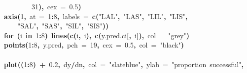 \documentclass{article}
\makeatletter
\newcommand{\hlnumber}[1]{\textcolor[rgb]{0,0,0}{#1}}%
\newcommand{\hlfunctioncall}[1]{\textcolor[rgb]{.5,0,.33}{\textbf{#1}}}%
\newcommand{\hlstring}[1]{\textcolor[rgb]{.6,.6,1}{#1}}%
\newcommand{\hlkeyword}[1]{\textbf{#1}}%
\newcommand{\hlargument}[1]{\textcolor[rgb]{.69,.25,.02}{#1}}%
\newcommand{\hlsymbol}[1]{#1}%
\newcommand{\hlstd}[1]{\textcolor[rgb]{0,0,0}{#1}}%
\newenvironment{kframe}{%
 \def\FrameCommand##1{\hskip\@totalleftmargin \hskip-\fboxsep
 \colorbox{shadecolor}{##1}\hskip-\fboxsep
     \hskip-\linewidth \hskip-\@totalleftmargin \hskip\columnwidth}%
 \MakeFramed {\advance\hsize-\width
   \@totalleftmargin\z@ \linewidth\hsize
   \@setminipage}}%
 {\par\unskip\endMakeFramed}
\newenvironment{knitrout}{}{} %
\makeatother
\begin{document}
\begin{knitrout}
{\begin{kframe}
\begin{flushleft}
\hlstd{}{\ }{\ }{\ }{\ }{\ }{\ }{\ }{\ }\hlnumber{31}\hlkeyword{)}\hlkeyword{,}{\ }\hlargument{cex}{\ }\hlargument{=}{\ }\hlnumber{0.5}\hlkeyword{)}\hspace*{\fill}\\
\hlstd{}\hlfunctioncall{axis}\hlkeyword{(}\hlnumber{1}\hlkeyword{,}{\ }\hlargument{at}{\ }\hlargument{=}{\ }\hlnumber{1}\hlkeyword{:}\hlnumber{8}\hlkeyword{,}{\ }\hlargument{labels}{\ }\hlargument{=}{\ }\hlfunctioncall{c}\hlkeyword{(}\hlstring{"LAL"}\hlkeyword{,}{\ }\hlstring{"LAS"}\hlkeyword{,}{\ }\hlstring{"LIL"}\hlkeyword{,}{\ }\hlstring{"LIS"}\hlkeyword{,}\hspace*{\fill}\\
\hlstd{}{\ }{\ }{\ }{\ }\hlstring{"SAL"}\hlkeyword{,}{\ }\hlstring{"SAS"}\hlkeyword{,}{\ }\hlstring{"SIL"}\hlkeyword{,}{\ }\hlstring{"SIS"}\hlkeyword{)}\hlkeyword{)}\hspace*{\fill}\\
\hlstd{}\hlkeyword{for}{\ }\hlkeyword{(}\hlsymbol{i}{\ }\hlkeyword{in}{\ }\hlnumber{1}\hlkeyword{:}\hlnumber{8}\hlkeyword{)}{\ }\hlfunctioncall{lines}\hlkeyword{(}\hlfunctioncall{c}\hlkeyword{(}\hlsymbol{i}\hlkeyword{,}{\ }\hlsymbol{i}\hlkeyword{)}\hlkeyword{,}{\ }\hlfunctioncall{c}\hlkeyword{(}\hlsymbol{y.pred.ci}\hlkeyword{[}\hlkeyword{,}{\ }\hlsymbol{i}\hlkeyword{]}\hlkeyword{)}\hlkeyword{,}{\ }\hlargument{col}{\ }\hlargument{=}{\ }\hlstring{"grey"}\hlkeyword{)}\hspace*{\fill}\\
\hlstd{}\hlfunctioncall{points}\hlkeyword{(}\hlnumber{1}\hlkeyword{:}\hlnumber{8}\hlkeyword{,}{\ }\hlsymbol{y.pred}\hlkeyword{,}{\ }\hlargument{pch}{\ }\hlargument{=}{\ }\hlnumber{19}\hlkeyword{,}{\ }\hlargument{cex}{\ }\hlargument{=}{\ }\hlnumber{0.5}\hlkeyword{,}{\ }\hlargument{col}{\ }\hlargument{=}{\ }\hlstring{"black"}\hlkeyword{)}\hspace*{\fill}\\
\hlstd{}\hspace*{\fill}\\
\hlstd{}\hlfunctioncall{plot}\hlkeyword{(}\hlkeyword{(}\hlnumber{1}\hlkeyword{:}\hlnumber{8}\hlkeyword{)}{\ }\hlkeyword{+}{\ }\hlnumber{0.2}\hlkeyword{,}{\ }\hlsymbol{d}\hlkeyword{\usebox{\hlnormalsizeboxdollar}}\hlsymbol{y}\hlkeyword{/}\hlsymbol{d}\hlkeyword{\usebox{\hlnormalsizeboxdollar}}\hlsymbol{n}\hlkeyword{,}{\ }\hlargument{col}{\ }\hlargument{=}{\ }\hlstring{"slateblue"}\hlkeyword{,}{\ }\hlargument{ylab}{\ }\hlargument{=}{\ }\hlstring{"proportion{\ }successful"}\hlkeyword{,}\hspace*{\fill}\\

\end{flushleft}
\end{kframe}}
\end{knitrout}
\end{document}
